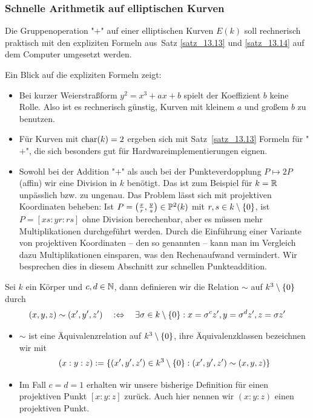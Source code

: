 \nextlecture
\subsubsection{Schnelle Arithmetik auf elliptischen Kurven}
	Die Gruppenoperation "$+$"\marginnote{[15]} auf einer elliptischen Kurven $E(k)$ soll rechnerisch praktisch mit den expliziten Formeln aus~Satz \ref{satz_13.13} und \ref{satz_13.14} auf dem Computer umgesetzt werden. 

\begin{bem}
	Ein Blick auf die expliziten Formeln zeigt:
	\begin{itemize}
		\item Bei kurzer Weierstraßform $y^2 = x^3 + ax + b$ spielt der Koeffizient $b$ keine Rolle.
		Also ist es rechnerisch günstig, Kurven mit kleinem $a$ und großem $b$ zu benutzen.
		\item Für Kurven mit $\operatorname{char}(k) = 2$ ergeben sich mit Satz~\ref{satz_13.13} Formeln für "$+$", die sich besonders gut für Hardwareimplementierungen eignen.
		\item Sowohl bei der Addition "$+$" als auch bei der Punkteverdopplung $P \mapsto 2P$ (affin) wir eine Division in $k$ benötigt.
		Das ist zum Beispiel für $k = \mathbb{R}$ unpässlich bzw. zu ungenau.
		Das Problem lässt sich mit projektiven Koordinaten beheben:
		Ist $P = \left(\frac{x}{r},\frac{y}{s}\right) \in \mathbb{P}^2(k)$ mit $r,s \in k \setminus \{0\}$, ist $P = [xs:yr:rs]$ ohne Division berechenbar, aber es müssen mehr Multiplikationen durchgeführt werden.
		Durch die Einführung einer Variante von projektiven Koordinaten -- den so genannten  --  kann man im Vergleich dazu Multiplikationen einsparen, was den Rechenaufwand vermindert.
		Wir besprechen dies in diesem Abschnitt zur schnellen Punkteaddition.
	\end{itemize}
\end{bem}

\begin{defn}
	Sei $k$ ein Körper und $c,d \in \mathbb{N}$, dann definieren wir die Relation $\sim$ auf $k^3\setminus \{0\}$ durch
	\[
		(x,y,z) \sim (x',y',z')	\quad :\Leftrightarrow \quad \exists \sigma \in k \setminus \{0\} : x = \sigma^c z', y = \sigma^d z', z=\sigma z'
	\]
\end{defn}

\begin{bem}
	\begin{itemize}
		\item $\sim$ ist eine Äquivalenzrelation auf $k^3 \setminus \{0\}$, ihre Äquivalenzklassen bezeichnen wir mit
		\[
			(x:y:z) := \{ (x',y',z') \in k^3 \setminus \{0\} : (x',y',z') \sim (x,y,z) \}
		\]
		\item Im Fall $c=d=1$ erhalten wir unsere bisherige Definition für einen projektiven Punkt $[x:y:z]$ zurück.
		Auch hier nennen wir $(x:y:z)$ einen projektiven Punkt.
	\end{itemize}
\end{bem}

